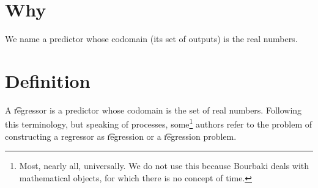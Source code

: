 

\section*{Why}

We name a predictor whose codomain (its set of outputs) is the real numbers.

\section*{Definition}

A \t{regressor} is a predictor whose codomain is the set of real numbers.
Following this terminology, but speaking of processes, some\footnote{Most, nearly all, universally. We do not use this because Bourbaki deals with mathematical objects, for which there is no concept of time.}
authors refer to the problem of constructing a regressor as \t{regression} or a \t{regression problem}.

\blankpage